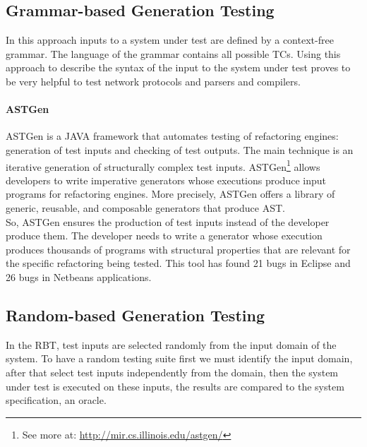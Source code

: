 \subsection{Grammar-based Generation Testing}
In this approach inputs to a system under test are defined by a context-free grammar. The language of the grammar contains all possible \ac{TC}s.
Using this approach to describe the syntax of the input to the system under test proves to be very helpful to test
network protocols\cite{tal:syntax-based,kaksonen2001functional} and parsers and compilers\cite{1994-burgess,Burgess_Saidi_1996}.

\paragraph{ASTGen}
ASTGen\cite{Daniel:2007:ATR:1287624.1287651} is a JAVA framework that automates testing of refactoring engines: generation of test inputs
and checking of test outputs. The main technique is an iterative generation of structurally complex test inputs.
ASTGen\footnote{See more at: \url{http://mir.cs.illinois.edu/astgen/}} allows developers to write imperative generators whose executions
produce input programs for refactoring engines. More precisely, ASTGen
offers a library of generic, reusable, and composable generators that produce \ac{AST}.\\
So, ASTGen ensures the production of test inputs instead of the developer produce them. The developer needs to write a generator whose execution
produces thousands of programs with structural properties that are relevant for the specific refactoring being tested. This tool has found
21 bugs in Eclipse and 26 bugs in Netbeans applications.

\subsection{Random-based Generation Testing}
In the \ac{RBT}, test inputs are selected randomly from the input domain of the system.
To have a random testing suite first we must identify the input domain, after that select test inputs independently from the domain,
then the system under test is executed on these inputs, the results are compared to the system specification, an oracle.

